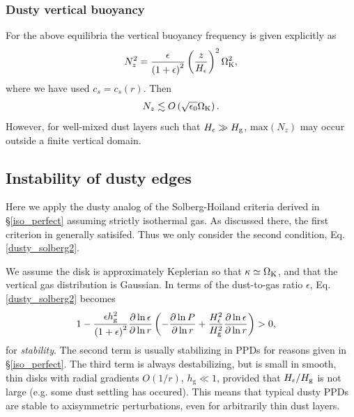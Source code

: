 \subsubsection{Dusty vertical buoyancy}\label{vbuoyancy}
For the above equilibria the vertical buoyancy frequency is given
explicitly as 
\begin{align}
  N_z^2 =
 \frac{\epsilon}{\left(1+\epsilon\right)^2}\left(\frac{z}{H_\epsilon}\right)^2\Omega_{\rm K}^2\notag,  
\end{align}
where we have used $c_s=c_s(r)$. Then 
\begin{align*}
N_z\lesssim
O\left(\sqrt{\epsilon_0}\Omega_{\rm K}\right). 
\end{align*}
However, for well-mixed dust layers such that $H_\epsilon \gg H_\mathrm{g}$, 
$\mathrm{max}\left(N_z\right)$ may occur outside a finite vertical domain.  

\subsection{Instability of dusty edges} 
Here we apply the dusty analog of the Solberg-Hoiland criteria derived
in \S\ref{iso_perfect} assuming strictly isothermal gas. As discussed
there, the first criterion in generally satisifed. Thus we only
consider the second condition, Eq. \ref{dusty_solberg2}.  

We assume the disk is approximately Keplerian so that
$\kappa\simeq\Omega_{\rm K}$, and that the vertical gas distribution is   
Gaussian. In terms of the dust-to-gas
ratio $\epsilon$, Eq. \ref{dusty_solberg2}
becomes 
\begin{align}
&1 - \frac{\epsilon
  h_\mathrm{g}^2}{\left(1+\epsilon\right)^2}
  \frac{\partial\ln{\epsilon}}{\partial\ln{r}}\left(-\frac{\partial\ln{P}}{\partial\ln{r}}+\frac{H_\epsilon^2}{H_\mathrm{g}^2}\frac{\partial\ln{\epsilon}}{\partial\ln{r}}\right)
  > 0 \label{stability_est2},
\end{align}
for \emph{stability}. The second term is usually stabilizing in 
PPDs for reasons given in \S\ref{iso_perfect}. The third term is
always destabilizing, but is small in smooth, thin disks with radial
gradients $O(1/r)$, $h_\mathrm{g}\ll 1$, 
provided that $H_\epsilon/H_\mathrm{g}$ is not large (e.g. some dust settling
has occured). This means that typical dusty PPDs are stable to
axisymmetric perturbations, even for arbitrarily thin
dust layers. 


